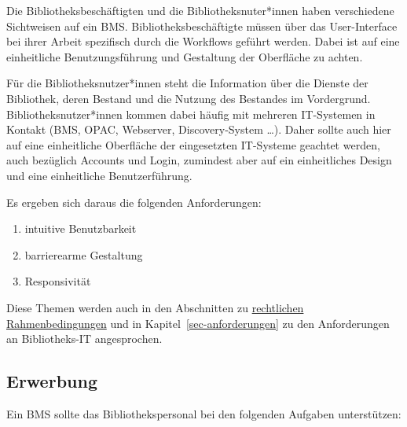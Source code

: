\documentclass[
  11pt,
  letterpaper,
  DIV=11,
  twoside]{scrreprt}
\begin{document}
Die Bibliotheksbeschäftigten und die Bibliotheksnuter*innen haben
verschiedene Sichtweisen auf ein BMS. Bibliotheksbeschäftigte müssen
über das User-Interface bei ihrer Arbeit spezifisch durch die Workflows
geführt werden. Dabei ist auf eine einheitliche Benutzungsführung und
Gestaltung der Oberfläche zu achten.

Für die Bibliotheksnutzer*innen steht die Information über die Dienste
der Bibliothek, deren Bestand und die Nutzung des Bestandes im
Vordergrund. Bibliotheksnutzer*innen kommen dabei häufig mit mehreren
IT-Systemen in Kontakt (BMS, OPAC, Webserver, Discovery-System \ldots).
Daher sollte auch hier auf eine einheitliche Oberfläche der eingesetzten
IT-Systeme geachtet werden, auch bezüglich Accounts und Login, zumindest
aber auf ein einheitliches Design und eine einheitliche Benutzerführung.

Es ergeben sich daraus die folgenden Anforderungen:

\begin{enumerate}
\def\labelenumi{\arabic{enumi}.}
\item
  intuitive Benutzbarkeit
\item
  barrierearme Gestaltung
\item
  Responsivität
\end{enumerate}

Diese Themen werden auch in den Abschnitten zu
\hyperref[rechtliche-rahmenbedingungen]{rechtlichen Rahmenbedingungen}
und in Kapitel~\ref{sec-anforderungen} zu den Anforderungen an
Bibliotheks-IT angesprochen.

\subsection{Erwerbung}\label{erwerbung-prozess}

Ein BMS sollte das Bibliothekspersonal bei den folgenden Aufgaben
unterstützen:
\end{document}
